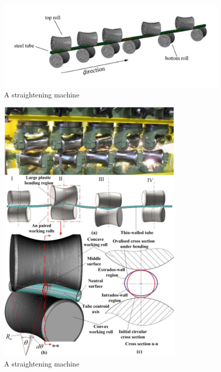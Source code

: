 \documentclass{article}
\begin{document}
\begin{figure}[H]
	\centering
	\includegraphics[]{straightening3.jpg}
	\caption{A straightening machine~\cite{ma2021analysis}}
	\label{straighteningImage3}
\end{figure}

\begin{figure}[H]
	\centering
	\includegraphics[width=90mm, keepaspectratio]{Straightening5.png}
	\caption{A straightening machine~\cite{zhang2019modeling}}
	\label{straighteningImage5}
\end{figure}
\end{document}

